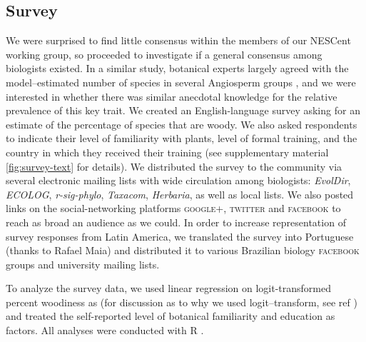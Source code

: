 \documentclass[12pt]{article}
\begin{document}
\subsection{Survey}

% 
%
We were surprised to find little consensus within the members of our
NESCent working group, so proceeded to investigate if a general
consensus among biologists existed.
% 
In a similar study, botanical experts largely agreed with the
model--estimated number of species in several Angiosperm groups
\citep{joppa2010}, and we were interested in whether there was similar
anecdotal knowledge for the relative prevalence of this key trait.
%
We created an English-language survey asking for an estimate of the
percentage of species that are woody.  We also asked respondents to
indicate their level of familiarity with plants, level of formal
training, and the country in which they received their training (see
supplementary material \ref{fig:survey-text} for details).
%
We distributed the survey to the community via several electronic
mailing lists with wide circulation among biologists: \emph{EvolDir},
\emph{ECOLOG}, \emph{r-sig-phylo}, \emph{Taxacom}, \emph{Herbaria}, as
well as local lists. We also posted links on the social-networking
platforms \textsc{google+}, \textsc{twitter} and \textsc{facebook} to
reach as broad an audience as we could.
In order to increase representation of survey responses from Latin
America, we translated the survey into Portuguese (thanks to Rafael
Maia) and distributed it to various Brazilian biology
\textsc{facebook} groups and university mailing lists.

To analyze the survey data, we used linear regression on
logit-transformed percent woodiness as (for discussion as to why we
used logit--transform, see ref \citep{wartonarcsine}) and treated the
self-reported level of botanical familiarity and education as factors.
All analyses were conducted with R \citep{R}.
\end{document}
